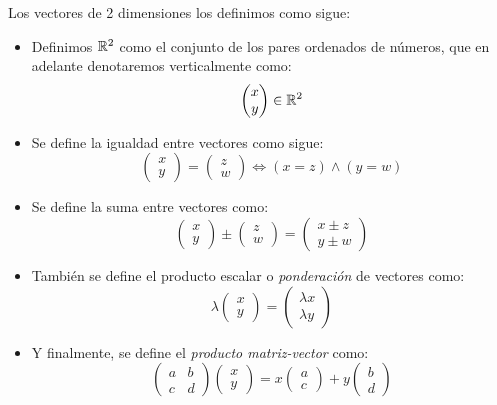 \begin{definition}
Los vectores de 2 dimensiones los definimos como sigue:
\begin{itemize}
\item Definimos $\mathbb{R}^2$ como el conjunto de los pares ordenados de números, que en adelante denotaremos verticalmente como:
$$  \begin{pmatrix} x \\ y \end{pmatrix} \in \mathbb{R}^2 $$
\item Se define la igualdad entre vectores como sigue:
$$  \begin{pmatrix} x \\ y \end{pmatrix} = \begin{pmatrix} z \\ w \end{pmatrix} \iff (x = z) \wedge (y = w) $$
\item Se define la suma entre vectores como:
$$  \begin{pmatrix} x \\ y \end{pmatrix} \pm  \begin{pmatrix} z \\ w \end{pmatrix} = \begin{pmatrix} x \pm z \\ y \pm w \end{pmatrix} $$
\item También se define el producto escalar o \textit{ponderación} de vectores como:
$$  \lambda  \begin{pmatrix} x \\ y \end{pmatrix} = \begin{pmatrix} \lambda x \\ \lambda y \end{pmatrix}$$
\item Y finalmente, se define el \textit{producto matriz-vector} como:
$$  \begin{pmatrix} a & b \\ c & d \end{pmatrix} \begin{pmatrix} x \\ y \end{pmatrix} = x \begin{pmatrix} a \\ c \end{pmatrix} + y \begin{pmatrix} b \\ d \end{pmatrix} $$
\end{itemize}
\end{definition}

